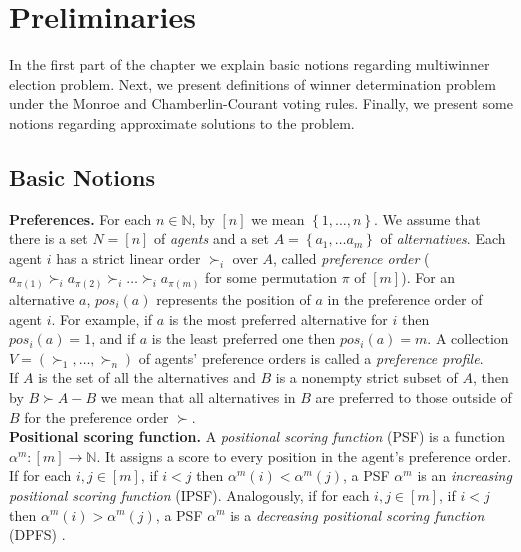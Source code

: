 \chapter{Preliminaries}
\label{cha:preliminaries}

In the first part of the chapter we explain basic notions regarding multiwinner election problem. Next, we present definitions of winner determination problem under the Monroe and Chamberlin-Courant voting rules. Finally, we present some notions regarding approximate solutions to the problem.

\section{Basic Notions}

\noindent
\textbf{Preferences.} \hspace{.1in} For each $n \in \mathbb{N}$, by $[n]$ we mean $\left\{ 1, \ldots, n \right\}$. We assume that there is a set $N = [n]$ of \textit{agents} and a set $A = \left\{ a_{1}, \ldots a_{m} \right\}$ of \textit{alternatives}. Each agent $i$ has a strict linear order $\succ_{i}$ over $A$, called \textit{preference order} ($a_{\pi(1)} \succ_{i} a_{\pi(2)} \succ_{i} \ldots \succ_{i} a_{\pi(m)}$ for some permutation $\pi$ of $[m]$). For an alternative $a$, $pos_{i}(a)$ represents the position of $a$ in the preference order of agent $i$. For example, if $a$ is the most preferred alternative for $i$ then $pos_{i}(a) = 1$, and if $a$ is the least preferred one then $pos_{i}(a) = m$. A collection $V = (\succ_{1}, \ldots, \succ_{n})$ of agents' preference orders is called a \textit{preference profile}.
\\

If $A$ is the set of all the alternatives and $B$ is a nonempty strict subset of $A$, then by $B \succ A - B$ we mean that all alternatives in $B$ are preferred to those outside of $B$ for the preference order $\succ$.
\\

\noindent
\textbf{Positional scoring function.} \hspace{.1in} A \textit{positional scoring function} (PSF) is a function $\alpha^{m}: [m] \rightarrow \mathbb{N}$. It assigns a score to every position in the agent's preference order. If for each $i,j \in [m]$, if $i < j$ then $\alpha^{m}(i) < \alpha^{m}(j)$, a PSF $\alpha^{m}$ is an \textit{increasing positional scoring function} (IPSF). Analogously, if for each $i,j \in [m]$, if $i < j$ then $\alpha^{m}(i) > \alpha^{m}(j)$, a PSF $\alpha^{m}$ is a \textit{decreasing positional scoring function} (DPFS) .
\\

